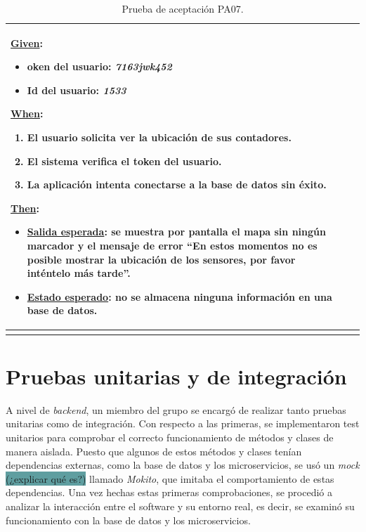 \documentclass[pdftex,11pt,a4paper]{book}
\begin{document}
\begin{center}
\begin{longtable}{|>{\centering\arraybackslash}X m{2cm}|m{12cm}|}
\underline{Given}:
\vspace{-3mm}
\begin{itemize}
\addtolength{\itemsep}{-3mm}
\item oken del usuario: \textit{7163jwk452}
\item Id del usuario: \textit{1533}

\end{itemize}

\underline{When}:
\begin{enumerate}
\vspace{-3mm}
\addtolength{\itemsep}{-3mm}
\item El usuario solicita ver la ubicación de sus contadores.
\item El sistema verifica el token del usuario.
\item La aplicación intenta conectarse a la base de datos sin éxito.

\end{enumerate}
\break

\underline{Then}:
\vspace{-3mm}
\begin{itemize}
\addtolength{\itemsep}{-3mm}
\item \underline{Salida esperada}: se muestra por pantalla el mapa sin ningún marcador y el mensaje de error “En estos momentos no es posible mostrar la ubicación de los sensores, por favor inténtelo más tarde”.
\item \underline{Estado esperado}: no se almacena ninguna información en una base de datos.
\end{itemize}
\\ \hline

\caption{Prueba de aceptación PA07.} \label{tablalarga:tablaPA07}
\end{longtable}
\end{center}









\section{Pruebas unitarias y de integración}

A nivel de \textit{backend}, un miembro del grupo se encargó de realizar tanto pruebas unitarias como de integración. Con respecto a las primeras, se implementaron test unitarios para comprobar el correcto funcionamiento de métodos y clases de manera aislada. Puesto que algunos de estos métodos y clases tenían dependencias externas, como la base de datos y los microservicios, se usó un \textit{mock}\colorbox{CadetBlue}{ (¿explicar qué es?)} llamado \textit{Mokito}, que imitaba el comportamiento de estas dependencias. 
Una vez hechas estas primeras comprobaciones, se procedió a analizar la interacción entre el software y su entorno real, es decir, se examinó su funcionamiento con la base de datos y los microservicios. 
\end{document}
